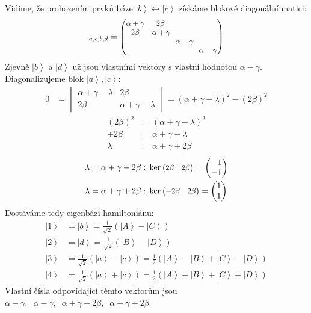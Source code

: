 \documentclass{article}
\def\ph{\phantom}
\newcommand{\ket}[1]{\left| #1 \right>}
\newcommand{\mat}[1]{
    \begin{pmatrix}
        #1
    \end{pmatrix}
}
\newcommand{\smat}[2][1]{
    \scalebox{#1}{$\mat{#2}$}
}
\begin{document}
Vidíme, že prohozením prvků báze $\ket{b} \!\leftrightarrow\! \ket{c}$ získáme blokově diagonální matici:
\begin{align*}
    [\hat H]_{a,c,b,d} =
    \smat[0.9]{
        \alpha + \gamma  & 2\beta \\
        2\beta &  \alpha + \gamma \! \\
        & &\! \alpha - \gamma \! \\
        & & & \! \alpha - \gamma
    }
\end{align*}
Zjevně $\ket{b}$ a $\ket{d}$ už jsou vlastními vektory s vlastní hodnotou $\alpha - \gamma$. Diagonalizujeme blok $\ket{a}, \ket{c}$:
\begin{align*}
    0 &=
    \begin{vmatrix}
        \alpha + \gamma - \lambda & 2\beta \\
        2\beta & \alpha + \gamma - \lambda
    \end{vmatrix}
    = (\alpha + \gamma - \lambda)^2 - (2\beta)^2
\end{align*}
\begin{align*}
    (2\beta)^2
    &=
    (\alpha + \gamma - \lambda)^2
    \\
    \pm 2\beta
    &=
    \alpha + \gamma - \lambda
    \\
    \lambda
    &=
    \alpha + \gamma \pm 2\beta
\end{align*}
\begin{align*}
    \lambda = \alpha + \gamma - 2\beta : \;
    &\ker \smat[0.9]{2\beta & 2\beta}
    = \mat{\ph{-}1 \\ -1}
    \\
    \lambda = \alpha + \gamma + 2\beta : \;
    &\ker \smat[0.9]{-2\beta & 2\beta}
    = \mat{1 \\ 1}
\end{align*}
Dostáváme tedy eigenbázi hamiltoniánu:
\begin{align*}
    \ket{1} &= \ket{b} = \frac{1}{\sqrt{2}} (\ket{A} - \ket{C}) \\
    \ket{2} &= \ket{d} = \frac{1}{\sqrt{2}} (\ket{B} - \ket{D}) \\
    \ket{3} &= \frac{1}{\sqrt{2}} (\ket{a} - \ket{c})
    = \frac{1}{2} (\ket{A} - \ket{B} + \ket{C} - \ket{D})\\
    \ket{4} &= \frac{1}{\sqrt{2}} (\ket{a} + \ket{c})
    = \frac{1}{2} (\ket{A} + \ket{B} + \ket{C} + \ket{D})
\end{align*}
Vlastní čísla odpovídající těmto vektorům jsou $\alpha - \gamma, \;\; \alpha - \gamma, \;\; \alpha + \gamma - 2\beta, \;\; \alpha + \gamma + 2\beta$.
\end{document}
